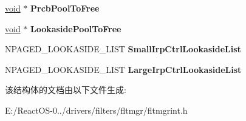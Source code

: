 \begin{DoxyCompactItemize}
\mbox{\label{struct___f_l_t_p___f_r_a_m_e_a314a012aa1e46734fa9bc14c0bd14149}} 
\hyperlink{interfacevoid}{void} $\ast$ {\bfseries Prcb\+Pool\+To\+Free}
\item 
\mbox{\label{struct___f_l_t_p___f_r_a_m_e_a99a357ab3c0b82ca1a9956d1312646ce}} 
\hyperlink{interfacevoid}{void} $\ast$ {\bfseries Lookaside\+Pool\+To\+Free}
\item 
\mbox{\label{struct___f_l_t_p___f_r_a_m_e_aa297943296882e124a770f00eede7cd2}} 
N\+P\+A\+G\+E\+D\+\_\+\+L\+O\+O\+K\+A\+S\+I\+D\+E\+\_\+\+L\+I\+ST {\bfseries Small\+Irp\+Ctrl\+Lookaside\+List}
\item 
\mbox{\label{struct___f_l_t_p___f_r_a_m_e_a17a3b624d209746c100fc7ed2262b139}} 
N\+P\+A\+G\+E\+D\+\_\+\+L\+O\+O\+K\+A\+S\+I\+D\+E\+\_\+\+L\+I\+ST {\bfseries Large\+Irp\+Ctrl\+Lookaside\+List}
\end{DoxyCompactItemize}


该结构体的文档由以下文件生成\+:\begin{DoxyCompactItemize}
\item 
E\+:/\+React\+O\+S-\/0../drivers/filters/fltmgr/fltmgrint.\+h\end{DoxyCompactItemize}
